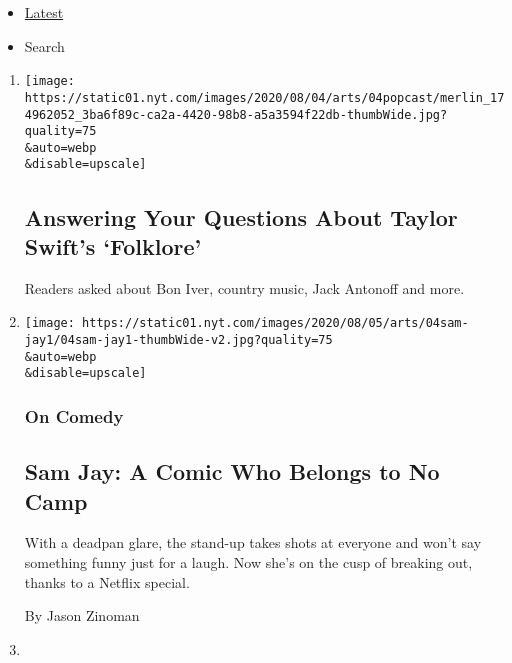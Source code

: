 \begin{itemize}
\tightlist
\item
  \protect\hyperlink{stream-panel}{Latest}
\item
  Search
\end{itemize}

\begin{enumerate}
\def\labelenumi{\arabic{enumi}.}
\item
  \href{/2020/08/04/arts/music/taylor-swift-folklore-questions.html}{}

  \texttt{[image: https://static01.nyt.com/images/2020/08/04/arts/04popcast/merlin\_174962052\_3ba6f89c-ca2a-4420-98b8-a5a3594f22db-thumbWide.jpg?quality=75\\\&auto=webp\\\&disable=upscale]}

  \hypertarget{answering-your-questions-about-taylor-swifts-folklore}{%
  \subsection{Answering Your Questions About Taylor Swift's
  `Folklore'}\label{answering-your-questions-about-taylor-swifts-folklore}}

  Readers asked about Bon Iver, country music, Jack Antonoff and more.
\item
  \href{/2020/08/04/arts/television/sam-jay-netflix-special.html}{}

  \texttt{[image: https://static01.nyt.com/images/2020/08/05/arts/04sam-jay1/04sam-jay1-thumbWide-v2.jpg?quality=75\\\&auto=webp\\\&disable=upscale]}

  \hypertarget{on-comedy}{%
  \subsubsection{On Comedy}\label{on-comedy}}

  \hypertarget{sam-jay-a-comic-who-belongs-to-no-camp}{%
  \subsection{Sam Jay: A Comic Who Belongs to No
  Camp}\label{sam-jay-a-comic-who-belongs-to-no-camp}}

  With a deadpan glare, the stand-up takes shots at everyone and won't
  say something funny just for a laugh. Now she's on the cusp of
  breaking out, thanks to a Netflix special.

  By Jason Zinoman
\item
  \href{/2020/08/04/arts/television/the-good-fight-the-split.html}{}


\end{enumerate}

